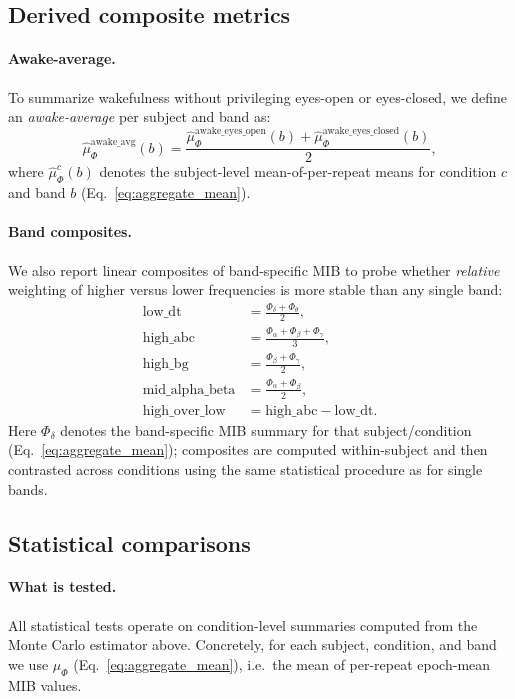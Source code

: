 \documentclass[11pt]{article}
\begin{document}
\subsection{Derived composite metrics}
\paragraph{Awake-average.}
To summarize wakefulness without privileging eyes-open or eyes-closed, we define an \emph{awake-average} per subject and band as:
\begin{equation}
\widehat{\mu}_{\Phi}^{\mathrm{awake\_avg}}(b)
=
\frac{\widehat{\mu}_{\Phi}^{\mathrm{awake\_eyes\_open}}(b) + \widehat{\mu}_{\Phi}^{\mathrm{awake\_eyes\_closed}}(b)}{2},
\label{eq:awake_avg}
\end{equation}
where $\widehat{\mu}_{\Phi}^{c}(b)$ denotes the subject-level mean-of-per-repeat means for condition $c$ and band $b$ (Eq.~\eqref{eq:aggregate_mean}).

\paragraph{Band composites.}
We also report linear composites of band-specific MIB to probe whether \emph{relative} weighting of higher versus lower frequencies is more stable than any single band:
\begin{align}
\mathrm{low\_dt} &= \frac{\Phi_{\delta} + \Phi_{\theta}}{2}, \\
\mathrm{high\_abc} &= \frac{\Phi_{\alpha} + \Phi_{\beta} + \Phi_{\gamma}}{3}, \\
\mathrm{high\_bg} &= \frac{\Phi_{\beta} + \Phi_{\gamma}}{2}, \\
\mathrm{mid\_alpha\_beta} &= \frac{\Phi_{\alpha} + \Phi_{\beta}}{2}, \\
\mathrm{high\_over\_low} &= \mathrm{high\_abc} - \mathrm{low\_dt}.
\end{align}
Here $\Phi_{\delta}$ denotes the band-specific MIB summary for that subject/condition (Eq.~\eqref{eq:aggregate_mean}); composites are computed within-subject and then contrasted across conditions using the same statistical procedure as for single bands.

\subsection{Statistical comparisons}
\paragraph{What is tested.}
All statistical tests operate on condition-level summaries computed from the Monte Carlo estimator above. Concretely, for each subject, condition, and band we use $\widehat{\mu}_{\Phi}$ (Eq.~\eqref{eq:aggregate_mean}), i.e.\ the mean of per-repeat epoch-mean MIB values.
\end{document}
